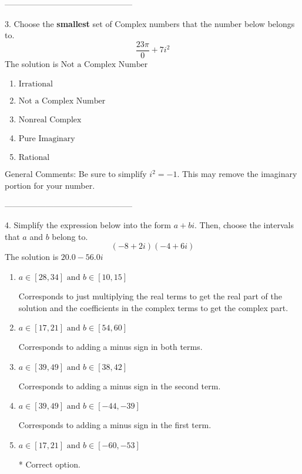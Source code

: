 \documentclass{article}[10pt]
\begin{document}
-----------------------------------------------

3. Choose the \textbf{smallest} set of Complex numbers that the number below belongs to.
$$ \frac{23 \pi}{0}+7 i^2 $$ 
The solution is $ \text{Not a Complex Number} $ 

\begin{enumerate}[label=\Alph*.] 
\item $ \text{Irrational} $ 

  
\item $ \text{Not a Complex Number} $ 

  
\item $ \text{Nonreal Complex} $ 

  
\item $ \text{Pure Imaginary} $ 

  
\item $ \text{Rational} $ 

  
\end{enumerate} 
 
General Comments: Be sure to simplify $i^2 = -1$. This may remove the imaginary portion for your number.

-----------------------------------------------

4. Simplify the expression below into the form $a+bi$. Then, choose the intervals that $a$ and $b$ belong to.
$$ (-8 + 2 i)(-4 + 6 i) $$ 
The solution is $ 20.0 - 56.0 i $ 

\begin{enumerate}[label=\Alph*.] 
\item $ a \in [28, 34] \text{ and } b \in [10, 15] $ 

  Corresponds to just multiplying the real terms to get the real part of the solution and the coefficients in the complex terms to get the complex part. 
\item $ a \in [17, 21] \text{ and } b \in [54, 60] $ 

  Corresponds to adding a minus sign in both terms. 
\item $ a \in [39, 49] \text{ and } b \in [38, 42] $ 

  Corresponds to adding a minus sign in the second term. 
\item $ a \in [39, 49] \text{ and } b \in [-44, -39] $ 

  Corresponds to adding a minus sign in the first term. 
\item $ a \in [17, 21] \text{ and } b \in [-60, -53] $ 

 * Correct option. 
\end{enumerate} 
 
\end{document}
